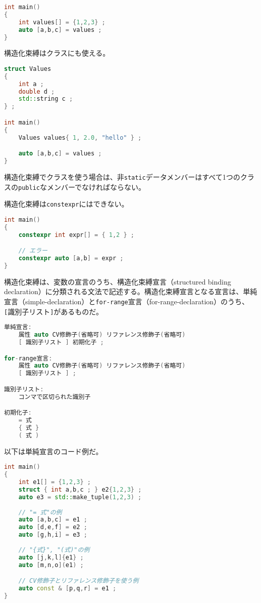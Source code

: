 \begin{lstlisting}[language=C++]
int main()
{
    int values[] = {1,2,3} ;
    auto [a,b,c] = values ;
}
\end{lstlisting}

構造化束縛はクラスにも使える。

\begin{lstlisting}[language=C++]
struct Values
{
    int a ;
    double d ;
    std::string c ;
} ;

int main()
{
    Values values{ 1, 2.0, "hello" } ;

    auto [a,b,c] = values ;
}
\end{lstlisting}

構造化束縛でクラスを使う場合は、非\lstinline!static!データメンバーはすべて1つのクラスの\lstinline!public!なメンバーでなければならない。

構造化束縛は\lstinline!constexpr!にはできない。

\begin{lstlisting}[language=C++]
int main()
{
    constexpr int expr[] = { 1,2 } ;

    // エラー
    constexpr auto [a,b] = expr ;
}
\end{lstlisting}

%

構造化束縛は、変数の宣言のうち、\textsf{構造化束縛宣言（structured binding declaration）}に分類される文法で記述する。構造化束縛宣言となる宣言は、単純宣言（simple-declaration）と\lstinline!for-range!宣言（for-range-declaration）のうち、\lstinline![!識別子リスト\lstinline!]!があるものだ。

\begin{lstlisting}[language=C++]
単純宣言:
    属性 auto CV修飾子(省略可) リファレンス修飾子(省略可)
    [ 識別子リスト ] 初期化子 ;

for-range宣言:
    属性 auto CV修飾子(省略可) リファレンス修飾子(省略可)
    [ 識別子リスト ] ;

識別子リスト:
    コンマで区切られた識別子

初期化子:
    = 式
    { 式 }
    ( 式 )
\end{lstlisting}

以下は単純宣言のコード例だ。

\begin{lstlisting}[language=C++]
int main()
{
    int e1[] = {1,2,3} ;
    struct { int a,b,c ; } e2{1,2,3} ;
    auto e3 = std::make_tuple(1,2,3) ;
    
    // "= 式"の例
    auto [a,b,c] = e1 ;
    auto [d,e,f] = e2 ;
    auto [g,h,i] = e3 ;
    
    // "{式}", "(式)"の例
    auto [j,k,l]{e1} ;
    auto [m,n,o](e1) ;

    // CV修飾子とリファレンス修飾子を使う例
    auto const & [p,q,r] = e1 ;
}
\end{lstlisting}

